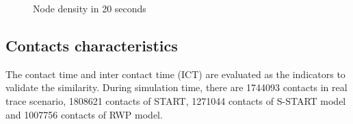 \begin{figure}
\centering
{}
\caption{Node density in 20 seconds}\label{figure_node_distribution}
\end{figure}


\subsection{Contacts characteristics}

The contact time and inter contact time (ICT) \cite{vHuWang-23} are evaluated as the indicators to validate the similarity.
During simulation time, there are 1744093 contacts in real trace scenario, 1808621 contacts of START, 1271044 contacts of S-START model and 1007756 contacts of RWP model.

